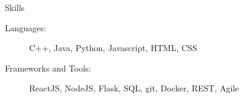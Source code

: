 \documentclass{resume} %
\begin{document}
\begin{rSection}{Skills}
    \begin{description}
    \item[Languages:] C++, Java, Python, Javascript, HTML, CSS
    \item[Frameworks and Tools:] ReactJS, NodeJS, Flask, SQL, git, Docker, REST, Agile
    \end{description}
\end{rSection}





\end{document}
